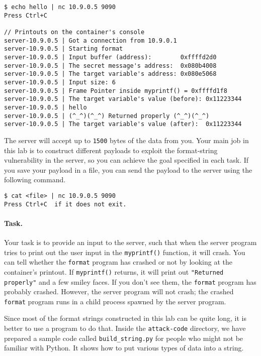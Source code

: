 \begin{lstlisting}
$ echo hello | nc 10.9.0.5 9090
Press Ctrl+C

// Printouts on the container's console
server-10.9.0.5 | Got a connection from 10.9.0.1
server-10.9.0.5 | Starting format
server-10.9.0.5 | Input buffer (address):        0xffffd2d0
server-10.9.0.5 | The secret message's address:  0x080b4008
server-10.9.0.5 | The target variable's address: 0x080e5068
server-10.9.0.5 | Input size: 6
server-10.9.0.5 | Frame Pointer inside myprintf() = 0xffffd1f8
server-10.9.0.5 | The target variable's value (before): 0x11223344
server-10.9.0.5 | hello
server-10.9.0.5 | (^_^)(^_^) Returned properly (^_^)(^_^)
server-10.9.0.5 | The target variable's value (after):  0x11223344
\end{lstlisting}
 
The server will accept up to \texttt{1500} bytes of the data from you.
Your main job in this lab is to construct different payloads to exploit the format-string 
vulnerability in the server, so you can achieve the goal specified in 
each task. If you save your payload in a file, you can send the payload
to the server using the following command.

\begin{lstlisting}
$ cat <file> | nc 10.9.0.5 9090
Press Ctrl+C  if it does not exit.
\end{lstlisting}

\paragraph{Task.} Your task is to provide an input to the server, such that
when the server program tries to print out the user input in the 
\texttt{myprintf()} function, it will crash. You can tell whether
the \texttt{format} program has crashed or not by looking at the 
container's printout.  If \texttt{myprintf()} returns, 
it will print out \texttt{"Returned properly"} and a few smiley faces.
If you don't see them, the \texttt{format} program has probably crashed.
However, the server program will not crash; the crashed \texttt{format} program
runs in a child process spawned by the server program. 


Since most of the format strings constructed in this lab can be quite long,
it is better to use a program to do that. Inside the \texttt{attack-code} 
directory, we have prepared a sample code called \texttt{build\_string.py}
for people who might not be familiar with Python. It shows how to put 
various types of data into a string. 




